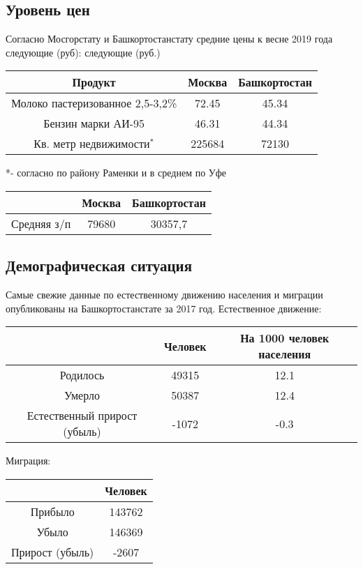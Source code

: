 \subsection{Уровень цен}
Согласно Мосгорстату и Башкортостанстату средние цены к весне 2019 года следующие (руб): следующие (руб.)\\

\begin{tabular}{|c|c|c|}
	\hline
	Продукт & Москва & Башкортостан \\
	\hline
	Молоко пастеризованное 2,5-3,2\% & 72.45 & 45.34 \\
	\hline
	Бензин марки АИ-95 & 46.31 & 44.34 \\
	\hline
	Кв. метр недвижимости$ ^*$ &  225684 & 72130\\
	\hline
\end{tabular}

*- согласно  по району Раменки и  в среднем по Уфе

\bigskip

\begin{tabular}{|c|c|c|}
	\hline
	& Москва & Башкортостан \\
	\hline
	Средняя з/п & 79680 & 30357,7\\
	\hline

\end{tabular}
\subsection{Демографическая ситуация}
Самые свежие данные по естественному движению населения и миграции опубликованы на Башкортостанстате за 2017 год. 
\newpage
Естественное движение:

\begin{tabular}{|c|c|c|}
	\hline
	& Человек & На 1000 человек населения \\
	\hline
	Родилось & 49315 & 12.1 \\
	\hline
	Умерло &  50387 & 12.4 \\
	\hline
	Естественный прирост (убыль) & -1072 & -0.3\\
	\hline
\end{tabular}

\bigskip

Миграция:

\begin{tabular}{|c|c|}
	\hline
	& Человек  \\
	\hline
	Прибыло &  143762 \\
	\hline
	Убыло &  146369 \\
	\hline
	Прирост (убыль) & -2607 \\
	\hline
\end{tabular}


